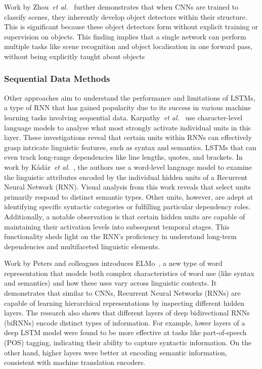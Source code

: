 Work by Zhou~\textit{et al.}~\cite{ZhouKLOT14} further demonstrates that when CNNs are trained to classify scenes, they inherently develop object detectors within their structure. This is significant because these object detectors form without explicit training or supervision on objects. This finding implies that a single network can perform multiple tasks like scene recognition and object localisation in one forward pass, without being explicitly taught about objects

\subsubsection{Sequential Data Methods}

Other approaches aim to understand the performance and limitations of LSTMs, a type of RNN that has gained popularity due to its success in various machine learning tasks involving sequential data. Karpathy~\textit{et al.}~\cite{KarpathyJL15} use character-level language models to analyse what most strongly activate individual units in this layer. These investigations reveal that certain units within RNNs can effectively grasp intricate linguistic features, such as syntax and semantics. LSTMs that can even track long-range dependencies like line lengths, quotes, and brackets. In work by Kádár~\textit{et al.}~\cite{KadarCA17}, the authors use a word-level language model to examine the linguistic attributes encoded by the individual hidden units of a Recurrent Neural Network (RNN). Visual analysis from this work reveals that select units primarily respond to distinct semantic types. Other units, however, are adept at identifying specific syntactic categories or fulfilling particular dependency roles. Additionally, a notable observation is that certain hidden units are capable of maintaining their activation levels into subsequent temporal stages. This functionality sheds light on the RNN's proficiency in understand long-term dependencies and multifaceted linguistic elements. 

Work by Peters and colleagues introduces ELMo~\cite{PetersNIGCLZ18}, a new type of word representation that models both complex characteristics of word use (like syntax and semantics) and how these uses vary across linguistic contexts. It demonstrates that similar to CNNs, Recurrent Neural Networks (RNNs) are capable of learning hierarchical representations by inspecting different hidden layers. The research also shows that different layers of deep bidirectional RNNs (biRNNs) encode distinct types of information. For example, lower layers of a deep LSTM model were found to be more effective at tasks like part-of-speech (POS) tagging, indicating their ability to capture syntactic information. On the other hand, higher layers were better at encoding semantic information, consistent with machine translation encoders.


